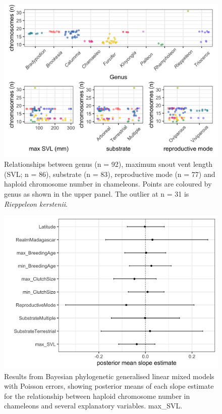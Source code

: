 \documentclass[a4paper, 12pt]{article}
\begin{document}


\begin{figure}[h]
 \centering
  \includegraphics[width = \linewidth]{figures/ecology-genus-svl.png}
  \caption{Relationships between genus (n = 92), maximum snout vent length (SVL; n = 86), substrate (n = 83), reproductive mode (n = 77) and haploid chromosome number in chameleons. Points are coloured by genus as shown in the upper panel. The outlier at n = 31 is \textit{Rieppeleon kerstenii}.
}
  \label{fig-ecology1}
\end{figure} 

\newpage
\begin{figure}[h]
 \centering
  \includegraphics[width = \linewidth]{figures/mcmcglmm-figure.png}
  \caption{Results from Bayesian phylogenetic generalised linear mixed models with Poisson errors, showing posterior means of each slope estimate for the relationship between haploid chromosome number in chameleons and several explanatory variables. max\_SVL.
}
  \label{fig-ecology2}
\end{figure}
\end{document}
